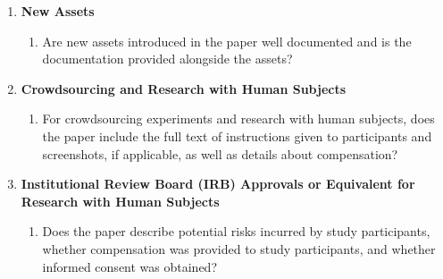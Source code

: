 \begin{enumerate}
\item {\bf New Assets}
    \begin{enumerate}
    \item Are new assets introduced in the paper well documented and is
          the documentation provided alongside the assets?
    \end{enumerate}

\item {\bf Crowdsourcing and Research with Human Subjects}
    \begin{enumerate}
    \item For crowdsourcing experiments and research with human
          subjects, does the paper include the full text of instructions
          given to participants and screenshots, if applicable, as well
          as details about compensation?
    \end{enumerate}

\item {\bf Institutional Review Board (IRB) Approvals or Equivalent for
       Research with Human Subjects}
    \begin{enumerate}
    \item Does the paper describe potential risks incurred by study
          participants, whether compensation was provided to study
          participants, and whether informed consent was obtained?
    \end{enumerate}


\end{enumerate}
